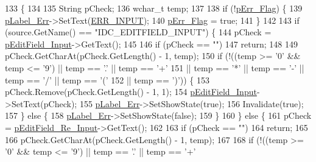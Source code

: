 \begin{DoxyCode}
133                                                                          \{
134 
135     String pCheck;
136     \textcolor{keywordtype}{wchar\_t} temp;
137 
138     \textcolor{keywordflow}{if} (!\hyperlink{_setting_password_form_8cpp_a84390b7bf6efb197dcb38cad6a7fa20a}{pErr\_Flag}) \{
139         \hyperlink{class_setting_password_form_a2cddadd3fdd619dc859566a6fde37c23}{pLabel\_Err}->SetText(\hyperlink{_setting_password_form_8cpp_a2b5379e8ea587202f8cad9cde49c1ae8}{ERR\_INPUT});
140         \hyperlink{_setting_password_form_8cpp_a84390b7bf6efb197dcb38cad6a7fa20a}{pErr\_Flag} = \textcolor{keyword}{true};
141     \}
142 
143     \textcolor{keywordflow}{if} (source.GetName() == \textcolor{stringliteral}{"IDC\_EDITFIELD\_INPUT"}) \{
144         pCheck = \hyperlink{class_setting_password_form_a2cd9d5f0b6101f19f47dbf6c6d268d71}{pEditField\_Input}->GetText();
145 
146         \textcolor{keywordflow}{if} (pCheck == \textcolor{stringliteral}{""})
147             \textcolor{keywordflow}{return};
148 
149         pCheck.GetCharAt(pCheck.GetLength() - 1, temp);
150         \textcolor{keywordflow}{if} (!((temp >= \textcolor{charliteral}{'0'} && temp <= \textcolor{charliteral}{'9'}) || temp == \textcolor{charliteral}{'.'} || temp == \textcolor{charliteral}{'+'}
151                 || temp == \textcolor{charliteral}{'*'} || temp == \textcolor{charliteral}{'-'} || temp == \textcolor{charliteral}{'/'} || temp == \textcolor{charliteral}{'('}
152                 || temp == \textcolor{charliteral}{')'})) \{
153             pCheck.Remove(pCheck.GetLength() - 1, 1);
154             \hyperlink{class_setting_password_form_a2cd9d5f0b6101f19f47dbf6c6d268d71}{pEditField\_Input}->SetText(pCheck);
155             \hyperlink{class_setting_password_form_a2cddadd3fdd619dc859566a6fde37c23}{pLabel\_Err}->SetShowState(\textcolor{keyword}{true});
156             Invalidate(\textcolor{keyword}{true});
157         \} \textcolor{keywordflow}{else} \{
158             \hyperlink{class_setting_password_form_a2cddadd3fdd619dc859566a6fde37c23}{pLabel\_Err}->SetShowState(\textcolor{keyword}{false});
159         \}
160     \} \textcolor{keywordflow}{else} \{
161         pCheck = \hyperlink{class_setting_password_form_a45848a36b44d294a9e7ddd1d921c990d}{pEditField\_Re\_Input}->GetText();
162 
163         \textcolor{keywordflow}{if} (pCheck == \textcolor{stringliteral}{""})
164             \textcolor{keywordflow}{return};
165 
166         pCheck.GetCharAt(pCheck.GetLength() - 1, temp);
167 
168         \textcolor{keywordflow}{if} (!((temp >= \textcolor{charliteral}{'0'} && temp <= \textcolor{charliteral}{'9'}) || temp == \textcolor{charliteral}{'.'} || temp == \textcolor{charliteral}{'+'}

\end{DoxyCode}
